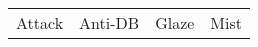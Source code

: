 \begin{tabular}{llll}
\toprule
Attack &                                                                                                                                                                                                                                                                                                                                                                                                                                                                                                                                                                                                                                                                                                                                                                                                                                                                                                                                                                                                                                                                     Anti-DB &                                                                                                                                                                                                                                                                                                                                                                                                                                                                                                                                                                                                                                                                                                                                                                                                                                                                                                                                                                                                                                                                      Glaze &                                                                                                                                                                                                                                                                                                                                                                                                                                                                                                                                                                                                                                                                                                                                                                                                                                                                                                                                                                                                                                                                       Mist \\

\end{tabular}
